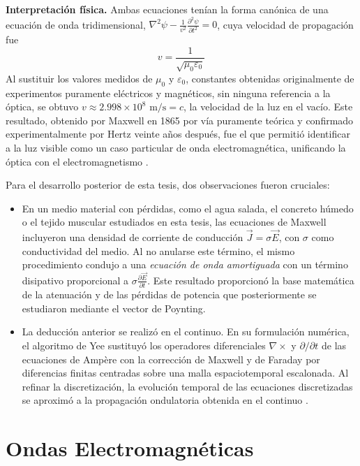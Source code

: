 \textbf{Interpretación física.} Ambas ecuaciones tenían la forma canónica de una ecuación de onda tridimensional, $\nabla^2 \psi - \frac{1}{v^2} \frac{\partial^2 \psi}{\partial t^2} = 0$, cuya velocidad de propagación fue
\begin{equation}
    v = \frac{1}{\sqrt{\mu_0 \varepsilon_0}}
\end{equation}
Al sustituir los valores medidos de $\mu_0$ y $\varepsilon_0$, constantes obtenidas originalmente de experimentos puramente eléctricos y magnéticos, sin ninguna referencia a la óptica, se obtuvo $v \approx 2.998 \times 10^8 \text{ m/s} = c$, la velocidad de la luz en el vacío. Este resultado, obtenido por Maxwell en 1865 por vía puramente teórica y confirmado experimentalmente por Hertz veinte años después, fue el que permitió identificar a la luz visible como un caso particular de onda electromagnética, unificando la óptica con el electromagnetismo \cite{Hon2020}.

Para el desarrollo posterior de esta tesis, dos observaciones fueron cruciales:
\begin{itemize}
    \item En un medio material con pérdidas, como el agua salada, el concreto húmedo o el tejido muscular estudiados en esta tesis, las ecuaciones de Maxwell incluyeron una densidad de corriente de conducción $\vec{J}=\sigma\vec{E}$, con $\sigma$ como conductividad del medio. Al no anularse este término, el mismo procedimiento condujo a una \textit{ecuación de onda amortiguada} con un término disipativo proporcional a $\sigma \frac{\partial \vec{E}}{\partial t}$. Este resultado proporcionó la base matemática de la atenuación y de las pérdidas de potencia que posteriormente se estudiaron mediante el vector de Poynting.
    \item La deducción anterior se realizó en el continuo. En su formulación numérica, el algoritmo de Yee sustituyó los operadores diferenciales $\nabla \times$ y $\partial/\partial t$ de las ecuaciones de Ampère con la corrección de Maxwell y de Faraday por diferencias finitas centradas sobre una malla espaciotemporal escalonada. Al refinar la discretización, la evolución temporal de las ecuaciones discretizadas se aproximó a la propagación ondulatoria obtenida en el continuo \cite{Yee1966, Teixeira2023}.
\end{itemize}

\section{Ondas Electromagnéticas}

